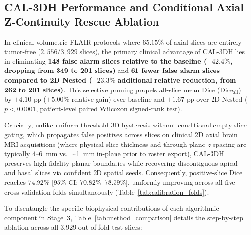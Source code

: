\documentclass[11pt,a4paper]{article}
\begin{document}
\subsection{CAL-3DH Performance and Conditional Axial Z-Continuity Rescue Ablation}
In clinical volumetric FLAIR protocols where $65.05\%$ of axial slices are entirely tumor-free ($2,556 / 3,929$ slices), the primary clinical advantage of CAL-3DH lies in eliminating \textbf{148 false alarm slices relative to the baseline ($-42.4\%$, dropping from 349 to 201 slices)} and \textbf{61 fewer false alarm slices compared to 2D Nested ($-23.3\%$ additional relative reduction, from 262 to 201 slices)}. This selective pruning propels all-slice mean Dice ($\text{Dice}_{\text{all}}$) by $+4.10\text{ pp}$ ($+5.00\%$ relative gain) over baseline and $+1.67\text{ pp}$ over 2D Nested ($p < 0.0001$, patient-level paired Wilcoxon signed-rank test).

Crucially, unlike uniform-threshold 3D hysteresis without conditional empty-slice gating, which propagates false positives across slices on clinical 2D axial brain MRI acquisitions (where physical slice thickness and through-plane $z$-spacing are typically 4--6~mm vs.\ $\sim$1~mm in-plane prior to raster export), CAL-3DH preserves high-fidelity planar boundaries while recovering discontiguous apical and basal slices via confident 2D spatial seeds. Consequently, positive-slice Dice reaches $74.92\%$ [95\% CI: $70.82\%$--$78.39\%$], uniformly improving across all five cross-validation folds simultaneously (Table~\ref{tab:calibration_folds}).

To disentangle the specific biophysical contributions of each algorithmic component in Stage~3, Table~\ref{tab:method_comparison} details the step-by-step ablation across all 3,929 out-of-fold test slices:
\end{document}
